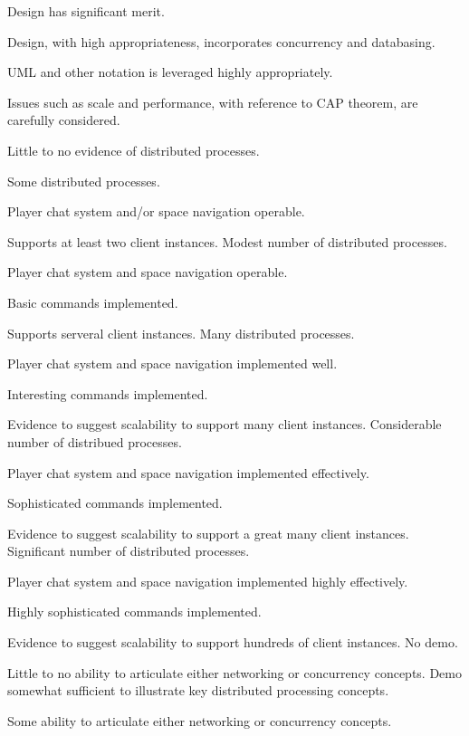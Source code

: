 \documentclass{../../../fal_assignment}
\begin{document}
\begin{markingrubric}
        \grade 		Design has significant merit.
            \par 		Design, with high appropriateness, incorporates concurrency and databasing.  
          \par 		UML and other notation is leveraged highly appropriately.
            \par 		Issues such as scale and performance, with reference to CAP theorem, are carefully considered.

%
        \grade\fail Little to no evidence of distributed processes.

        \grade Some distributed processes.
	\par  Player chat system and/or space navigation operable.
	\par  Supports at least two client instances.
        \grade Modest number of distributed processes.
	\par  Player chat system and space navigation operable.
	\par  Basic commands implemented.
	\par  Supports serveral client instances.
        \grade Many distributed processes.
	\par  Player chat system and space navigation implemented well.
	\par  Interesting commands implemented.
	\par  Evidence to suggest scalability to support many client instances.
        \grade Considerable number of distribued processes.
	\par  Player chat system and space navigation implemented effectively.
	\par  Sophisticated commands implemented.
	\par  Evidence to suggest scalability to support a great many client instances.
        \grade Significant number of distributed processes.
	\par  Player chat system and space navigation implemented highly effectively.
	\par  Highly sophisticated commands implemented.
	\par  Evidence to suggest scalability to support hundreds of client instances.
%
        \grade\fail No demo.
            \par Little to no ability to articulate either networking or concurrency concepts.
        \grade Demo somewhat sufficient to illustrate key distributed processing concepts.
            \par Some ability to articulate either networking or concurrency concepts.

\end{markingrubric}
\end{document}
